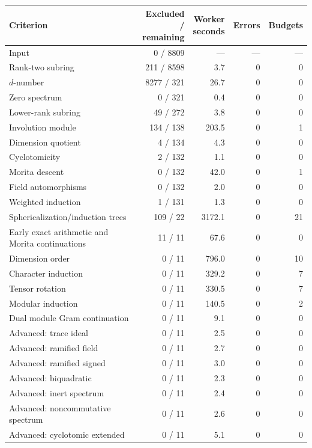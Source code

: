 \begin{table}[p]\centering\small
\setlength{\tabcolsep}{4pt}
\begin{tabular*}{\textwidth}{@{\extracolsep{\fill}}p{}rrrr@{}}\toprule
Criterion & \shortstack{Excluded /\\remaining} & \shortstack{Worker\\seconds} & Errors & Budgets\\\midrule
Input & 0 / 8809 & --- & --- & ---\\
Rank-two subring & 211 / 8598 & 3.7 & 0 & 0\\
$d$-number & 8277 / 321 & 26.7 & 0 & 0\\
Zero spectrum & 0 / 321 & 0.4 & 0 & 0\\
Lower-rank subring & 49 / 272 & 3.8 & 0 & 0\\
Involution module & 134 / 138 & 203.5 & 0 & 1\\
Dimension quotient & 4 / 134 & 4.3 & 0 & 0\\
Cyclotomicity & 2 / 132 & 1.1 & 0 & 0\\
Morita descent & 0 / 132 & 42.0 & 0 & 1\\
Field automorphisms & 0 / 132 & 2.0 & 0 & 0\\
Weighted induction & 1 / 131 & 1.3 & 0 & 0\\
Sphericalization/induction trees & 109 / 22 & 3172.1 & 0 & 21\\
Early exact arithmetic and Morita continuations & 11 / 11 & 67.6 & 0 & 0\\
Dimension order & 0 / 11 & 796.0 & 0 & 10\\
Character induction & 0 / 11 & 329.2 & 0 & 7\\
Tensor rotation & 0 / 11 & 330.5 & 0 & 7\\
Modular induction & 0 / 11 & 140.5 & 0 & 2\\
Dual module Gram continuation & 0 / 11 & 9.1 & 0 & 0\\
Advanced: trace ideal & 0 / 11 & 2.5 & 0 & 0\\
Advanced: ramified field & 0 / 11 & 2.7 & 0 & 0\\
Advanced: ramified signed & 0 / 11 & 3.0 & 0 & 0\\
Advanced: biquadratic & 0 / 11 & 2.3 & 0 & 0\\
Advanced: inert spectrum & 0 / 11 & 2.4 & 0 & 0\\
Advanced: noncommutative spectrum & 0 / 11 & 2.6 & 0 & 0\\
Advanced: cyclotomic extended & 0 / 11 & 5.1 & 0 & 0\\

\end{tabular*}
\end{table}
